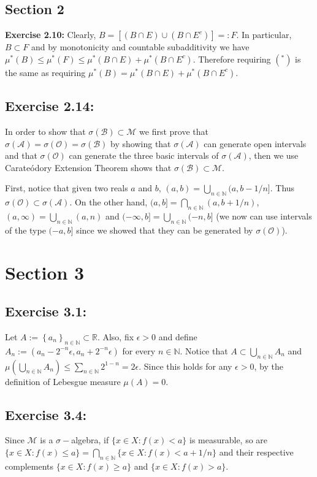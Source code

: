 \documentclass[11.5pt, letterpaper, bibtotoc,
    tablecaptionabove, figurecaptionabove]{article}
\begin{document}
\subsection*{Section 2}

\textbf{Exercise 2.10:}
Clearly, $B = [(B\cap E)\cup(B\cap E^c)] =: F$.
In particular, $B \subset F$ and by monotonicity and countable subadditivity we have 
$\mu^*(B)\le\mu^*(F)\le\mu^*(B\cap E) + \mu^*(B\cap E^c)$.
Therefore requiring $(^*)$ is the same as requiring $\mu^*(B)=\mu^*(B\cap E) + \mu^*(B\cap E^c)$.

\subsection*{Exercise 2.14:}
In order to show that $\sigma(\mathcal B)\subset\mathcal M$ we first prove that
$\sigma(\mathcal A) = \sigma(\mathcal O) = \sigma(\mathcal B)$ by showing that $\sigma(\mathcal A)$
can generate open intervals and that $\sigma(\mathcal O)$ can generate the three basic intervals of
$\sigma(\mathcal A)$,
then we use Carate\'odory Extension Theorem shows that $\sigma(\mathcal B)\subset\mathcal M$.

First, notice that given two reals $a$ and $b$, $(a,b)=\bigcup_{n\in\mathbb N}(a, b-1/n]$.
Thus $\sigma(\mathcal O) \subset \sigma(\mathcal A)$.
On the other hand, $(a, b] = \bigcap_{n\in\mathbb N}(a, b+1/n)$,
$(a, \infty) = \bigcup_{n\in\mathbb N}(a, n)$ and 
$(-\infty, b] = \bigcup_{n\in\mathbb N}(-n, b]$ (we now can use intervals of the type $(-a, b]$ since we showed that they can be generated by $\sigma(\mathcal O)$).

\section*{Section 3}

\subsection*{Exercise 3.1:}
Let $A:=\left\{ a_n \right\}_{n\in\mathbb N}\subset\mathbb R$.
Also, fix $\epsilon>0$ and define $A_n:=(a_n-2^{-n}\epsilon, a_n+2^{-n}\epsilon)$ for every $n\in\mathbb N$.
Notice that $A\subset\bigcup_{n\in\mathbb N}A_n$ and 
$\mu(\bigcup_{n\in\mathbb N} A_n)\leq \sum_{n\in\mathbb N}2^{1-n}=2\epsilon$.
Since this holds for any $\epsilon>0$, by the definition of Lebesgue measure
$\mu(A)=0$.

\subsection*{Exercise 3.4:}
Since $\mathcal M$ is a $\sigma-$algebra, if $\{x\in X: f(x)<a\}$ is measurable,
so are $\{x\in X: f(x)\leq a\}=\bigcap_{n\in\mathbb N}\{x\in X: f(x)<a+1/n\}$
and their respective complements $\{x\in X: f(x)\geq a\}$ and $\{x\in X: f(x)> a\}$.
\end{document}
